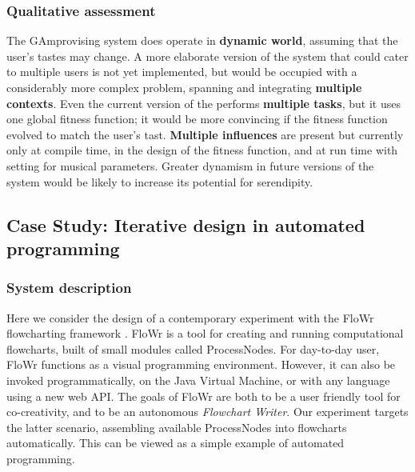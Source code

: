 \subsubsection{Qualitative assessment}

The {\sf GAmprovising} system does operate in \textbf{dynamic world},
assuming that the user's tastes may change.  A more elaborate version
of the system that could cater to multiple users is not yet
implemented, but would be occupied with a considerably more complex
problem, spanning and integrating \textbf{multiple contexts}.  Even
the current version of the performs \textbf{multiple tasks}, but it
uses one global fitness function; it would be more convincing if the
fitness function evolved to match the user's tast.  \textbf{Multiple
  influences} are present but currently only at compile time, in the
design of the fitness function, and at run time with setting for
musical parameters.  Greater dynamism in future versions of the system
would be likely to increase its potential for serendipity.


\subsection{Case Study: Iterative design in automated programming} \label{sec:flowchartassembly}

\subsubsection{System description}

Here we consider the design of a contemporary experiment with the
{\sf FloWr} flowcharting framework \cite{colton-flowcharting}.  
%
{\sf FloWr} is a tool for creating and running computational
flowcharts, built of small modules called ProcessNodes.
%
For day-to-day user, {\sf FloWr} functions as a visual programming
environment.  However, it can also be invoked programmatically, on the
Java Virtual Machine, or with any language using a new web API.  The
goals of {\sf FloWr} are both to be a user friendly tool for
co-creativity, and to be an autonomous \emph{Flowchart Writer}.  Our
experiment targets the latter scenario, assembling available
ProcessNodes into flowcharts automatically.  This can be viewed as a
simple example of automated programming.

